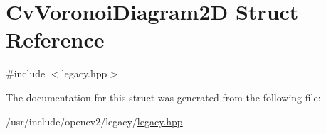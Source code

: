 \hypertarget{structCvVoronoiDiagram2D}{\section{Cv\-Voronoi\-Diagram2\-D Struct Reference}
\label{structCvVoronoiDiagram2D}
}


{\ttfamily \#include $<$legacy.\-hpp$>$}



The documentation for this struct was generated from the following file\-:\begin{DoxyCompactItemize}
\item 
/usr/include/opencv2/legacy/\hyperlink{legacy_8hpp}{legacy.\-hpp}\end{DoxyCompactItemize}
